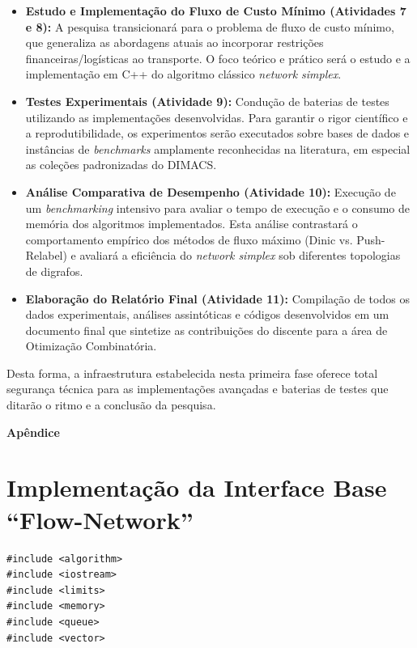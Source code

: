 \documentclass[12pt,a4paper]{article}
\begin{document}
\begin{enumerate}
\begin{itemize}
    \item \textbf{Estudo e Implementação do Fluxo de Custo Mínimo (Atividades 7 e 8):} A pesquisa transicionará para o problema de fluxo de custo mínimo, que generaliza as abordagens atuais ao incorporar restrições financeiras/logísticas ao transporte. O foco teórico e prático será o estudo e a implementação em C++ do algoritmo clássico \textit{network simplex}.
    \item \textbf{Testes Experimentais (Atividade 9):} Condução de baterias de testes utilizando as implementações desenvolvidas. Para garantir o rigor científico e a reprodutibilidade, os experimentos serão executados sobre bases de dados e instâncias de \textit{benchmarks} amplamente reconhecidas na literatura, em especial as coleções padronizadas do DIMACS.
    \item \textbf{Análise Comparativa de Desempenho (Atividade 10):} Execução de um \textit{benchmarking} intensivo para avaliar o tempo de execução e o consumo de memória dos algoritmos implementados. Esta análise contrastará o comportamento empírico dos métodos de fluxo máximo (Dinic vs. Push-Relabel) e avaliará a eficiência do \textit{network simplex} sob diferentes topologias de digrafos.
    \item \textbf{Elaboração do Relatório Final (Atividade 11):} Compilação de todos os dados experimentais, análises assintóticas e códigos desenvolvidos em um documento final que sintetize as contribuições do discente para a área de Otimização Combinatória.
\end{itemize}

Desta forma, a infraestrutura estabelecida nesta primeira fase oferece total segurança técnica para as implementações avançadas e baterias de testes que ditarão o ritmo e a conclusão da pesquisa.

\newpage




\newpage
\appendix

\begin{center}{\Large\textbf{Apêndice}}\end{center}
\section{Implementação da Interface Base ``Flow-Network''}
\label{ap:flownetwork}

\begin{lstlisting}[caption={Implementação em C++ da interface base \lstinline{FlowNetwork} para a modelagem abstrata de redes de fluxo.}, label={lst:flownetwork}]
#include <algorithm>
#include <iostream>
#include <limits>
#include <memory>
#include <queue>
#include <vector>


\end{lstlisting}
\end{enumerate}
\end{document}
